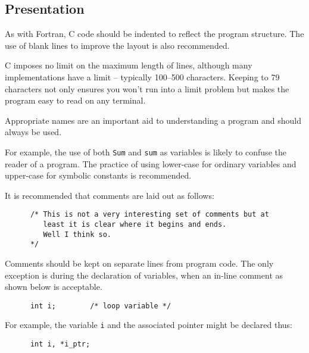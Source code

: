 \newpage
\subsection{Presentation}


As with Fortran, C code should be indented to reflect the program structure.
The use of blank lines to improve the layout is also recommended.


C imposes no limit on the maximum length of lines, although many 
implementations have a limit -- typically 100--500 characters.
Keeping to 79 characters not only ensures you won't run into a 
limit problem but 
makes the program easy to read on any terminal.


Appropriate names are an important aid to understanding a program 
and should always be used.



For example, the use of both {\tt Sum} and {\tt sum} as variables is likely 
to confuse the reader of a program.
The practice of using lower-case for ordinary variables and upper-case
for symbolic constants is recommended.





It is recommended that comments are laid out as follows:
\begin{verbatim}
      /* This is not a very interesting set of comments but at
         least it is clear where it begins and ends. 
         Well I think so. 
      */
\end{verbatim}
Comments should be kept on separate lines from program code.
The only exception is during the declaration of variables, when an in-line
comment as shown below is acceptable.
\begin{verbatim}
      int i;        /* loop variable */
\end{verbatim}



For example, the variable {\tt i} and the associated pointer 
might be declared thus:
\begin{verbatim}
      int i, *i_ptr;
\end{verbatim}



